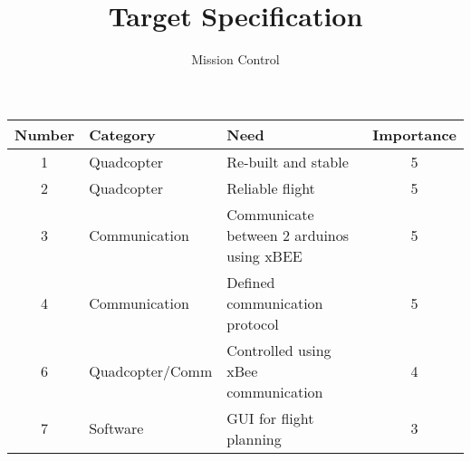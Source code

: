 \documentclass[11pt]{article}
\author{Mission Control}
\title{Target Specification}
\begin{document}
	\maketitle

	\begin{center}
	
	\begin{tabular}{c|l|l|c}
		\hline 
		Number & Category & Need & Importance \\ 
		\hline 
		1 & Quadcopter & Re-built and stable & 5 \\
		2 & Quadcopter & Reliable flight & 5 \\
		3 & Communication & Communicate between 2 arduinos using xBEE & 5 \\
		4 & Communication & Defined communication protocol & 5 \\
		6 & Quadcopter/Comm & Controlled using xBee communication & 4 \\
		7 & Software & GUI for flight planning & 3 \\



	
	\end{tabular}
	\end{center}
\end{document}
